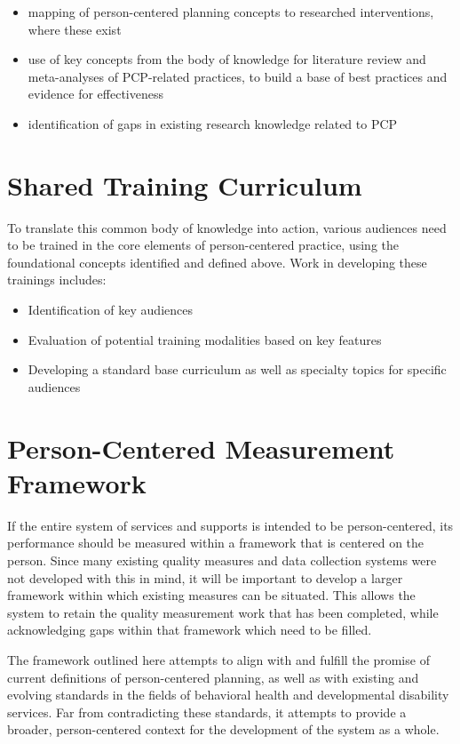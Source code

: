 \documentclass[
]{book}
\providecommand{\tightlist}{%
  \setlength{\itemsep}{0pt}\setlength{\parskip}{0pt}}
\begin{document}
\begin{itemize}
\tightlist
\item
  mapping of person-centered planning concepts to researched interventions, where these exist
\item
  use of key concepts from the body of knowledge for literature review and meta-analyses of PCP-related practices, to build a base of best practices and evidence for effectiveness
\item
  identification of gaps in existing research knowledge related to PCP
\end{itemize}

\hypertarget{curriculum}{%
\chapter{Shared Training Curriculum}\label{curriculum}}

To translate this common body of knowledge into action, various audiences need to be trained in the core elements of person-centered practice, using the foundational concepts identified and defined above. Work in developing these trainings includes:

\begin{itemize}
\tightlist
\item
  Identification of key audiences
\item
  Evaluation of potential training modalities based on key features
\item
  Developing a standard base curriculum as well as specialty topics for specific audiences
\end{itemize}

\hypertarget{measure}{%
\chapter{Person-Centered Measurement Framework}\label{measure}}

If the entire system of services and supports is intended to be person-centered, its performance should be measured within a framework that is centered on the person. Since many existing quality measures and data collection systems were not developed with this in mind, it will be important to develop a larger framework within which existing measures can be situated. This allows the system to retain the quality measurement work that has been completed, while acknowledging gaps within that framework which need to be filled.

The framework outlined here attempts to align with and fulfill the promise of current definitions of person-centered planning, as well as with existing and evolving standards in the fields of behavioral health and developmental disability services. Far from contradicting these standards, it attempts to provide a broader, person-centered context for the development of the system as a whole.
\end{document}
